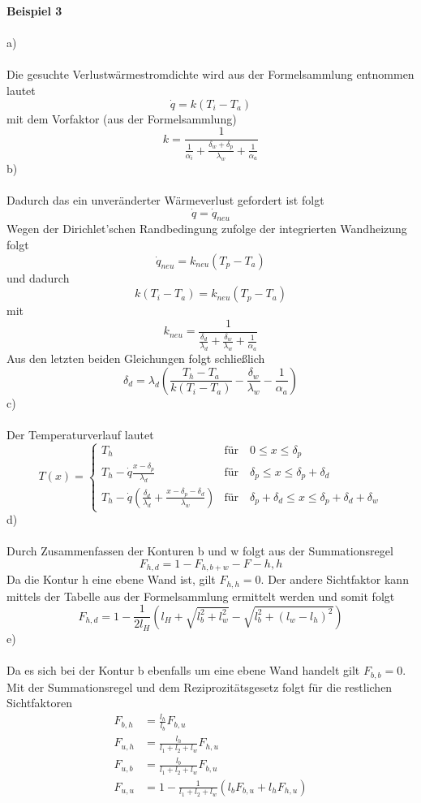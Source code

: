 \newpage
\noindent
\textbf{Beispiel 3}\\ \\
a)\\ \\
Die gesuchte Verlustwärmestromdichte wird aus der Formelsammlung entnommen lautet
\[
	\dot{q} = k(T_i - T_a)
\]
mit dem Vorfaktor (aus der Formelsammlung)
\[
	k = \frac{1}{\frac{1}{\alpha_i} + \frac{\delta_w + \delta_p}{\lambda_w} + \frac{1}{\alpha_a}}
\]
b)\\ \\
Dadurch das ein unveränderter Wärmeverlust gefordert ist folgt
\[
	\dot{q} = \dot{q}_{neu}
\]
Wegen der Dirichlet'schen Randbedingung zufolge der integrierten Wandheizung folgt
\[
	\dot{q}_{neu} = k_{neu}(T_p - T_a)
\]
und dadurch
\[
	k(T_i - T_a) = k_{neu}(T_p - T_a)
\]
mit
\[
	k_{neu} = \frac{1}{\frac{\delta_d}{\lambda_d} + \frac{\delta_w}{\lambda_w} + \frac{1}{\alpha_a}}
\]
Aus den letzten beiden Gleichungen folgt schließlich
\[
	\delta_d = \lambda_d\left(\frac{T_h - T_a}{k(T_i - T_a)} - \frac{\delta_w}{\lambda_w} - \frac{1}{\alpha_a}\right)
\]
c)\\ \\
Der Temperaturverlauf lautet
\[
	T(x) = \left\{
	\begin{array}{lll}
	T_h & \text{für} \quad 0 \leq x \leq \delta_p \\
	T_h - \dot{q}\frac{x - \delta_p}{\lambda_d} & \text{für} \quad \delta_p \leq x \leq \delta_p + \delta_d\\
	T_h - \dot{q}\left(\frac{\delta_d}{\lambda_d} + \frac{x - \delta_p - \delta_d}{\lambda_w}\right) & \text{für} \quad \delta_p + \delta_d \leq x \leq \delta_p + \delta_d + \delta_w
	\end{array}
	\right.
\]
d)\\ \\
Durch Zusammenfassen der Konturen b und w folgt aus der Summationsregel
\[
	F_{h,d} = 1 - F_{h,b+w} - F-{h,h}
\]
Da die Kontur h eine ebene Wand ist, gilt $F_{h,h} = 0$. Der andere Sichtfaktor kann mittels der Tabelle aus der Formelsammlung ermittelt werden und somit folgt
\[
	F_{h,d} = 1 - \frac{1}{2l_H}\left(l_H + \sqrt{l_b^2 + l_w^2} - \sqrt{l_b^2 + (l_w - l_h)^2}\right)	
\]
\newpage
\noindent
e)\\ \\
Da es sich bei der Kontur b ebenfalls um eine ebene Wand handelt gilt $F_{b,b} = 0$. Mit der Summationsregel und dem Reziprozitätsgesetz folgt für die restlichen Sichtfaktoren
\begin{align*}
	F_{b,h} &= \frac{l_h}{l_b}F_{b,u} \\
	F_{u,h} &= \frac{l_h}{l_1 + l_2 + l_w}F_{h,u} \\
	F_{u,b} &= \frac{l_b}{l_1 + l_2 + l_w}F_{b,u} \\
	F_{u,u} &= 1 - \frac{1}{l_1 + l_2 + l_w}(l_bF_{b,u} + l_hF_{h,u})
\end{align*}
